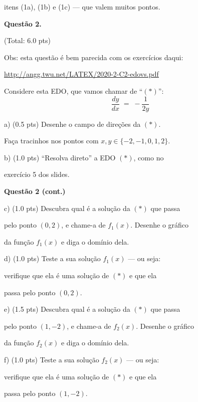 \documentclass[oneside,12pt]{article}
\begin{document}
itens (1a), (1b) e (1c) --- que valem muitos pontos.




\newpage


{\bf Questão 2.}

\T(Total: 6.0 pts)

\msk

Obs: esta questão é bem parecida com os exercícios daqui:

{\footnotesize

\url{http://angg.twu.net/LATEX/2020-2-C2-edovs.pdf}

}

\bsk

Considere esta EDO, que vamos chamar de ``$(*)$'':
%
$$\frac{dy}{dx} \; = \; - \frac{1}{2y}$$

a) \B(0.5 pts) Desenhe o campo de direções da $(*)$.

Faça tracinhos nos pontos com $x,y∈\{-2,-1,0,1,2\}$.

\msk

b) \B(1.0 pts) ``Resolva direto'' a EDO $(*)$, como no

exercício 5 dos slides.

\newpage

{\bf Questão 2 (cont.)}

\ssk

c) \B(1.0 pts) Descubra qual é a solução da $(*)$ que passa

pelo ponto $(0,2)$, e chame-a de $f_1(x)$. Desenhe o gráfico

da função $f_1(x)$ e diga o domínio dela.

\msk

d) \B(1.0 pts) Teste a sua solução $f_1(x)$ --- ou seja:

verifique que ela é uma solução de $(*)$ e que ela

passa pelo ponto $(0,2)$.

\msk

e) \B(1.5 pts) Descubra qual é a solução da $(*)$ que passa

pelo ponto $(1,-2)$, e chame-a de $f_2(x)$. Desenhe o gráfico

da função $f_2(x)$ e diga o domínio dela.

\msk

f) \B(1.0 pts) Teste a sua solução $f_2(x)$ --- ou seja:

verifique que ela é uma solução de $(*)$ e que ela

passa pelo ponto $(1,-2)$.




\newpage


\end{document}
